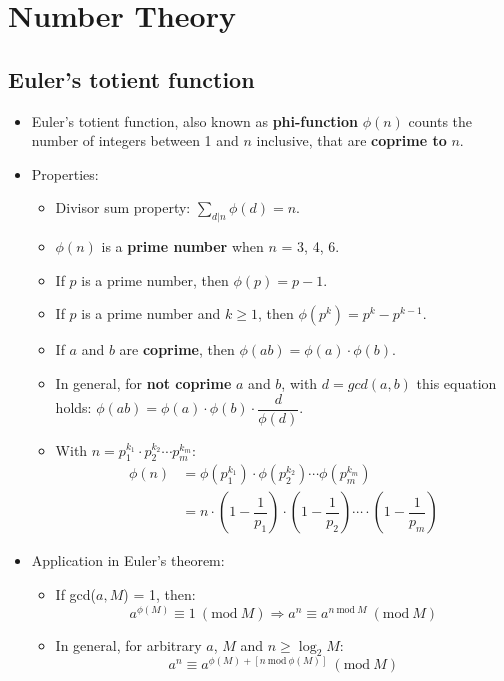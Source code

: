 \section{Number Theory}

\subsection{Euler's totient function}
\begin{itemize}
	\item Euler's totient function, also known as \textbf{phi-function} $\phi(n)$ 
	counts the number of integers between 1 and $n$ inclusive, that are
	\textbf{coprime to} $n$.
	\item Properties:
	\begin{itemize}
		\item Divisor sum property: $\sum\limits_{d | n} \phi(d) = n$.
		\item $\phi(n)$ is a \textbf{prime number} when $n$ = 3, 4, 6.
		\item If $p$ is a prime number, then $\phi(p) = p - 1$.
		\item If $p$ is a prime number and $k \geq 1$, then $\phi(p^k) = p^k - p^{k - 1}$.
		\item If $a$ and $b$ are \textbf{coprime}, then $\phi(ab) = \phi(a) \cdot \phi(b)$.
		\item In general, for \textbf{not coprime} $a$ and $b$, with $d = gcd(a, b)$ this equation holds: 
		$\phi(ab) = \phi(a) \cdot \phi(b) \cdot \dfrac{d}{\phi(d)}$.
		\item With $n = p_1^{k_1} \cdot p_2^{k_2} \cdots p_m^{k_m}$:
		\begin{align*}
			\phi(n) &= \phi(p_1^{k_1}) \cdot \phi(p_2^{k_2}) \cdots \phi(p_m^{k_m}) \\ 
			&= n \cdot \left(1 - \dfrac{1}{p_1}\right) \cdot \left(1 - \dfrac{1}{p_2}\right) \cdots \cdot \left(1 - \dfrac{1}{p_m}\right)
		\end{align*}
	\end{itemize}
	\item Application in Euler's theorem:
	\begin{itemize}
		\item If gcd($a, M$) = 1, then:
		\[ a^{\phi(M)} \equiv 1\ (\text{mod}\ M) \Rightarrow a^{n} \equiv a^{n\ \text{mod}\ M}\ (\text{mod}\ M)\]
		\item In general, for arbitrary $a$, $M$ and $n \geq \log_2{M}$:
		\[ a^{n} \equiv a^{\phi(M) + [n\ \text{mod}\ \phi(M)]}\ (\text{mod}\ M)\]
	\end{itemize}
\end{itemize}

